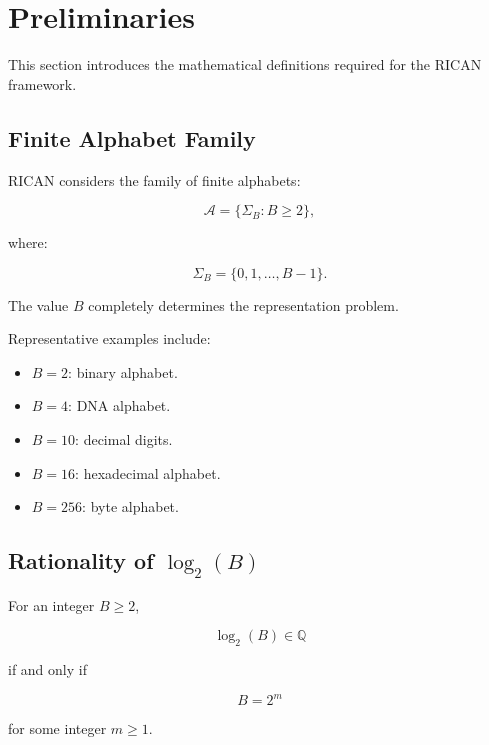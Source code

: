 \documentclass[onecolumn]{IEEEtran}
\begin{document}
\section{Preliminaries}

This section introduces the mathematical definitions required for the
RICAN framework.

\subsection{Finite Alphabet Family}

RICAN considers the family of finite alphabets:

\[
\mathcal{A}
=
\{\Sigma_B:B\geq2\},
\]

where:

\[
\Sigma_B=
\{0,1,\ldots,B-1\}.
\]

The value $B$ completely determines the representation problem.

Representative examples include:

\begin{itemize}

\item $B=2$: binary alphabet.

\item $B=4$: DNA alphabet.

\item $B=10$: decimal digits.

\item $B=16$: hexadecimal alphabet.

\item $B=256$: byte alphabet.

\end{itemize}

\subsection{Rationality of $\log_2(B)$}

\begin{lemma}
\label{lem:rationality}

For an integer $B\geq2$,

\[
\log_2(B)\in\mathbb{Q}
\]

if and only if

\[
B=2^m
\]

for some integer $m\geq1$.

\end{lemma}
\end{document}
